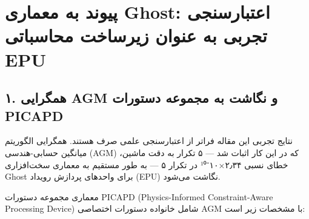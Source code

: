 \documentclass[12pt, a4paper]{article}
\begin{document}

\section*{پیوند به معماری Ghost: اعتبارسنجی تجربی به عنوان زیرساخت محاسباتی EPU}

\subsection*{۱. همگرایی AGM و نگاشت به مجموعه دستورات PICAPD}

نتایج تجربی این مقاله فراتر از اعتبارسنجی علمی صرف هستند. همگرایی الگوریتم میانگین حسابی-هندسی (AGM) که در این کار اثبات شد — ۵ تکرار به دقت ماشین، خطای نسبی ۲٫۳۴×۱۰⁻¹⁰ در تکرار ۵ — به طور مستقیم به معماری سخت‌افزاری Ghost برای واحدهای پردازش رویداد (EPU) نگاشت می‌شود.

معماری مجموعه دستورات PICAPD (Physics-Informed Constraint-Aware Processing Device) شامل خانواده دستورات اختصاصی AGM با مشخصات زیر است:
\end{document}
